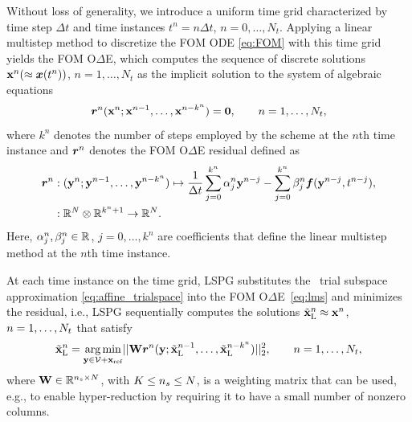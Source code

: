 \documentclass[3p,computermodern,10pt]{elsarticle}
\begin{document}
Without loss of generality, we introduce a uniform time
grid characterized by time step $\Delta t$ and time instances
$t^n = n\Delta
t$, $n=0,\ldots,N_t$.
Applying a linear multistep method to discretize the FOM ODE \eqref{eq:FOM}
with this time grid
yields the FOM O$\Delta$E, which computes the sequence of discrete
solutions
${\mathbf{x}}^{n}( \approx {\boldsymbol x}(t^n))$, $n=1,\ldots,N_t$
as the implicit solution to the system of algebraic equations
\begin{equation}\label{eq:lms}
\boldsymbol r_{}^{n}
	({\mathbf{x}}^{n};{\mathbf{x}}^{n-1},\ldots,{\mathbf{x}}^{n-k^n})
	= \boldsymbol 0,\qquad n=1,\ldots,N_t,
\end{equation}
where  $k^n$ denotes the number of steps employed by the scheme at the $n$th
time instance and 
$\boldsymbol r_{}^{n}$ denotes the FOM O$\Delta$E residual defined as
\begin{align*}
\boldsymbol r_{}^{n} &: (\mathbf{y}^{n};\mathbf{y}^{n-1},\ldots,\mathbf{y}^{n-k^n}) \mapsto  \frac{1}{\Delta t} \sum_{j=0}^{k^n} \alpha^n_j \mathbf{y}^{n-j} -  \sum_{j=0}^{k^n} \beta^n_j \boldsymbol f(\mathbf{y}^{n-j},t^{n-j}),
\\
&: \mathbb{R}^{N} \otimes \mathbb{R}^{k^n + 1} \rightarrow \mathbb{R}^{N}.
\end{align*} 
Here, $\alpha^n_j,\beta^n_j\in\mathbb{R}^{}$, $j=0,\ldots,k^n$ are coefficients
that define the linear multistep method at the $n$th time instance.

At each time instance on the time grid, LSPG substitutes the \spatialAcronym\ trial subspace approximation
\eqref{eq:affine_trialspace} into the FOM O$\Delta$E~\eqref{eq:lms} and
minimizes the residual, i.e., LSPG sequentially computes the solutions
$\tilde{\mathbf{x}}_{\text{L}}^n \approx {\mathbf{x}}^{n}$, $n=1,\ldots,
N_t$ that satisfy
\begin{equation*}
\tilde{\mathbf{x}}_{\text{L}}^n = \underset{\mathbf{y} \in \mathcal{V } + \mathbf{x}_\text{ref} }{\text{arg\,min}}|| \mathbf{W}\boldsymbol r_{}^{n} (\mathbf{y}; \tilde{\mathbf{x}}_{\text{L}}^{n-1},\ldots,\tilde{\mathbf{x}}_{\text{L}}^{n-k^n}) ||_2^2, \qquad n = 1,\ldots,N_t,
\end{equation*}
where 
$\mathbf{W} \in \mathbb{R}^{n_s \times N}$, with $K
\le n_s \le N$, is a weighting matrix that can be used, e.g., to
enable hyper-reduction by requiring it to have a small number of nonzero
columns. 
\end{document}
